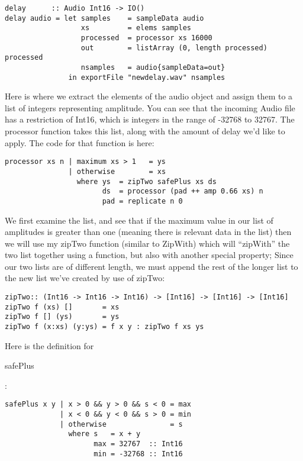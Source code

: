 \documentclass[12pt]{article}
\begin{document}
\begin{verbatim}
delay      :: Audio Int16 -> IO()
delay audio = let samples    = sampleData audio
                  xs         = elems samples
                  processed  = processor xs 16000
                  out        = listArray (0, length processed) processed
                  nsamples   = audio{sampleData=out}
               in exportFile "newdelay.wav" nsamples\end{verbatim}
Here is where we extract the elements of the audio object and assign them to a list of integers representing amplitude. You can see that the incoming Audio file has a restriction of Int16, which is integers in the range of  -32768 to 32767. The processor function takes this list, along with the amount of delay we'd like to apply. The code for that function is here:
\begin{verbatim}
processor xs n | maximum xs > 1   = ys
               | otherwise        = xs
                 where ys  = zipTwo safePlus xs ds
                       ds  = processor (pad ++ amp 0.66 xs) n
                       pad = replicate n 0
\end{verbatim}
We first examine the list, and see that if the maximum value in our list of amplitudes is greater than one (meaning there is relevant data in the list) then we will use my zipTwo function (similar to ZipWith) which will ``zipWith'' the two list together using a function, but also with another special property; Since our two lists are of different length, we must append the rest of the longer list to the new list we've created by use of zipTwo:
\begin{verbatim}
zipTwo:: (Int16 -> Int16 -> Int16) -> [Int16] -> [Int16] -> [Int16]
zipTwo f (xs) []       = xs
zipTwo f [] (ys)       = ys
zipTwo f (x:xs) (y:ys) = f x y : zipTwo f xs ys
\end{verbatim}
Here is the definition for \begin{tt}safePlus\end{tt} :
\begin{verbatim}
safePlus x y | x > 0 && y > 0 && s < 0 = max
             | x < 0 && y < 0 && s > 0 = min
             | otherwise               = s
               where s   = x + y
                     max = 32767  :: Int16
                     min = -32768 :: Int16
\end{verbatim}
\end{document}
